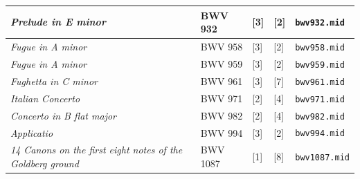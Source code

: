 \documentclass[a4paper, 11pt, twoside]{report}
\theoremstyle{definition}
\begin{document}
\begin{longtable}{ |S{0.37\textwidth}|P{0.12\textwidth}|P{0.09\textwidth}|P{0.09\textwidth}|S{0.21\textwidth}| }
\textit{Prelude in E minor} 										& BWV 932	& [3] 	& [2] 	& \texttt{bwv932.mid} 			\\ \hline
\textit{Fugue in A minor} 											& BWV 958	& [3] 	& [2] 	& \texttt{bwv958.mid} 			\\ \hline
\textit{Fugue in A minor} 											& BWV 959	& [3] 	& [2] 	& \texttt{bwv959.mid} 			\\ \hline
\textit{Fughetta in C minor} 										& BWV 961	& [3] 	& [7] 	& \texttt{bwv961.mid} 			\\ \hline
\textit{Italian Concerto} 											& BWV 971	& [2] 	& [4] 	& \texttt{bwv971.mid} 			\\ \hline
\textit{Concerto in B flat major} 									& BWV 982	& [2] 	& [4] 	& \texttt{bwv982.mid} 			\\ \hline
\textit{Applicatio} 												& BWV 994	& [3] 	& [2] 	& \texttt{bwv994.mid} 			\\ \hline
\setlength{\baselineskip}{11pt}\textit{14 Canons on the first eight notes of the Goldberg ground} 	& BWV 1087	& [1] 	& [8] 	& \texttt{bwv1087.mid}	\\ \hline
\end{longtable}

\newpage

\null\thispagestyle{empty}\newpage
\end{document}
